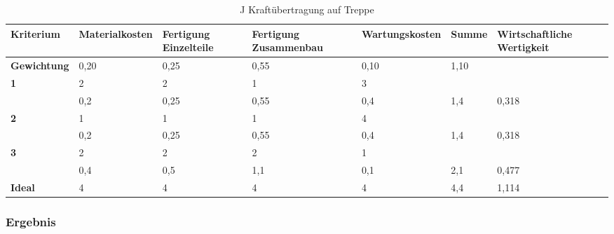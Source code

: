 \documentclass[10pt,a4paper]{article}
\begin{document}
\begin{table}[h!]
    \centering
    \hspace*{0in} %
    \begin{tabular}{>{\bfseries}p{2cm} p{2.2cm} p{2cm} p{2cm} p{2.5cm} p{2cm} p{2cm}}
        \toprule
        Kriterium  & Materialkosten & Fertigung Einzelteile & Fertigung Zusammenbau & Wartungskosten & Summe & Wirtschaftliche Wertigkeit \\
        \midrule
        Gewichtung & 0,20           & 0,25                  & 0,55                  & 0,10           & 1,10  &                            \\
        \midrule
        1          & 2              & 2                     & 1                     & 3              &       &                            \\
                   & 0,2            & 0,25                  & 0,55                  & 0,4            & 1,4   & 0,318                      \\
        \midrule
        2          & 1              & 1                     & 1                     & 4              &       &                            \\
                   & 0,2            & 0,25                  & 0,55                  & 0,4            & 1,4   & 0,318                      \\
        \midrule
        3          & 2              & 2                     & 2                     & 1              &       &                            \\
                   & 0,4            & 0,5                   & 1,1                   & 0,1            & 2,1   & 0,477                      \\
        \midrule
        Ideal      & 4              & 4                     & 4                     & 4              & 4,4   & 1,114                      \\
        \bottomrule
    \end{tabular}
    \caption{J Kraftübertragung auf Treppe}
\end{table}

\clearpage

\subsubsection{Ergebnis}
\end{document}
